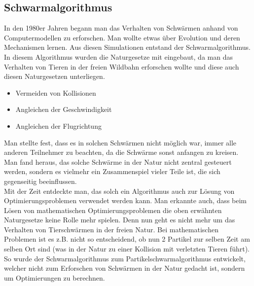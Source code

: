 \subsection{Schwarmalgorithmus}

In den 1980er Jahren begann man das Verhalten von Schwärmen anhand von Computermodellen zu erforschen. Man wollte etwas über Evolution und deren Mechanismen lernen. Aus diesen Simulationen entstand der Schwarmalgorithmus.
In diesem Algorithmus wurden die Naturgesetze mit eingebaut, da man das Verhalten von Tieren in der freien Wildbahn erforschen wollte und diese auch diesen Naturgesetzen unterliegen.

\begin{itemize}
\item Vermeiden von Kollisionen 
\item Angleichen der Geschwindigkeit
\item Angleichen der Flugrichtung
\end{itemize}

Man stellte fest, dass es in solchen Schwärmen nicht möglich war, immer alle anderen Teilnehmer zu beachten, da die Schwärme sonst anfangen zu kreisen. Man fand heraus, das solche Schwärme in der Natur nicht zentral gesteuert werden, sondern es vielmehr ein Zusammenspiel vieler Teile ist, die sich gegenseitig beeinflussen.\\
Mit der Zeit entdeckte man, das solch ein Algorithmus auch zur Lösung von Optimierungsproblemen verwendet werden kann.
Man erkannte auch, dass beim Lösen von mathematischen Optimierungsproblemen die oben erwähnten Naturgesetze keine Rolle mehr spielen. Denn nun geht es nicht mehr um das Verhalten von Tierschwärmen in der freien Natur. Bei mathematischen Problemen ist es z.B. nicht so entscheidend, ob nun 2 Partikel zur selben Zeit am selben Ort sind (was in der Natur zu einer Kollision mit verletzten Tieren führt). So wurde der Schwarmalgorithmus zum Partikelschwarmalgorithmus entwickelt, welcher nicht zum Erforschen von Schwärmen in der Natur gedacht ist, sondern um Optimierungen zu berechnen.